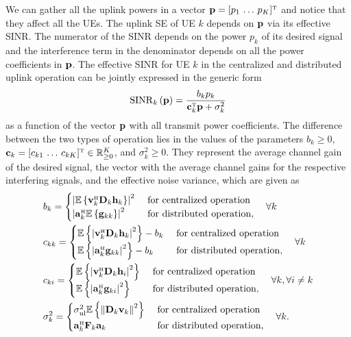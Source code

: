 We can gather all the uplink powers in a vector $\vect{p}=[p_1 \, \ldots \, p_K]^{\Ttran}$ and notice that they affect all the UEs. The uplink SE of UE $k$ depends on $\mathbf{p}$ via its effective SINR. The numerator of the SINR depends on the power $p_k$ of its desired signal and the interference term in the denominator depends on all the power coefficients in $\mathbf{p}$. The effective SINR for UE $k$ in the centralized and distributed uplink operation can be jointly expressed in the generic form
\enlargethispage{\baselineskip} 
\begin{align}\label{eq:SINR-uplink}
\mathrm{SINR}_k\left(\vect{p}\right)=\frac{b_kp_k}{\vect{c}_k^{\Ttran}\vect{p}+\sigma_k^2}
\end{align}
as a function of the vector $\mathbf{p}$ with all transmit power coefficients.
The difference between the two types of operation lies in the values of the parameters $b_k \geq 0$, $\vect{c}_k=[c_{k1} \, \ldots \, c_{kK}]^{\Ttran}\in \mathbb{R}_{\geq 0}^K$, and $\sigma_k^2 \geq 0$. They represent the average channel gain of the desired signal, the vector with the average channel gains for the respective interfering signals, and the effective noise variance, which are given as
\begin{align}
&b_k=\begin{cases} \left| \mathbb{E} \left\{ \vect{v}_k^{\Htran}\vect{D}_k\vect{h}_k\right\}\right|^2 & \text{ for centralized operation} \\
\left| \vect{a}_k^{\Htran}\mathbb{E} \left\{ \vect{g}_{kk}\right\}\right|^2 & \text{ for distributed operation}, \end{cases} \quad \forall k \\
&c_{kk}=\begin{cases} \mathbb{E} \left\{\left|  \vect{v}_k^{\Htran}\vect{D}_k\vect{h}_k\right|^2\right\}-b_k & \text{ for centralized operation} \\
\mathbb{E} \left\{ \left| \vect{a}_k^{\Htran}\vect{g}_{kk}\right|^2\right\}-b_k & \text{ for distributed operation}, \end{cases} \quad \forall k\\
&c_{ki}=\begin{cases} \mathbb{E} \left\{\left|  \vect{v}_k^{\Htran}\vect{D}_k\vect{h}_i\right|^2\right\} & \text{ for centralized operation} \\
\mathbb{E} \left\{ \left| \vect{a}_k^{\Htran}\vect{g}_{ki}\right|^2 \right\} & \text{ for distributed operation}, \end{cases} \quad \forall k, \forall i\neq k \\
&\sigma_k^2=\begin{cases} \sigmaUL\mathbb{E} \left\{ \left\Vert \vect{D}_k\vect{v}_k\right\Vert^2\right\} & \text{ for centralized operation} \\
 \vect{a}_k^{\Htran}\vect{F}_k\vect{a}_{k} & \text{ for distributed operation}, \end{cases} \quad \forall k.
\end{align}
